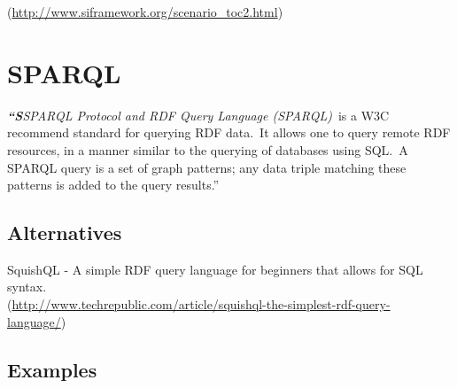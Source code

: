 \documentclass[DIV=calc, paper=a4, fontsize=12pt, onecolumn]{scrartcl}	 %
\newcommand{\initial}[1]{ %
\lettrine[lines=3,lhang=0.3,nindent=0em,slope=0em]{
\color{DarkBlue}
{\textbf{\textit{#1}}}}{}}
\begin{document}
(\url{http://www.siframework.org/scenario_toc2.html})\


\section[SPARQL Protocol and RDF Query Language (SPARQL)]{SPARQL}
  \label{sec:sparql}

\initial{``S}\textit{SPARQL Protocol and RDF Query Language (SPARQL)}\
		is a W3C recommend standard for querying RDF data.\
		It allows one to query remote RDF resources, in a manner similar to the querying of databases using SQL.\
		A SPARQL query is a set of graph patterns; any data triple matching these patterns is added to the query results.''\
                   \citep{Jarrar_mashql:_2008}     
		
		\subsection{Alternatives}

		SquishQL - A simple RDF query language for beginners that allows for SQL syntax.\\
		(\url{http://www.techrepublic.com/article/squishql-the-simplest-rdf-query-language/})\

\subsection{Examples}
\end{document}
